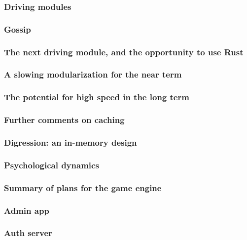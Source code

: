 \subsubsection{Driving modules}
\label{sec:future:impl:drivers}


\subsubsection{Gossip}
\label{sec:future:impl:gossip}


\subsubsection{The next driving module, and the opportunity to use Rust}
\label{sec:future:impl:rust}


\subsubsection{A slowing modularization for the near term}
\label{sec:future:impl:shortTerm}


\subsubsection{The potential for high speed in the long term}
\label{sec:future:impl:longTerm}


\subsubsection{Further comments on caching}
\label{sec:future:impl:moreCaching}


\subsubsection{Digression: an in-memory design}
\label{sec:future:impl:inMemoryDB}


\subsubsection{Psychological dynamics}
\label{sec:future:impl:psycho}


\subsubsection{Summary of plans for the game engine}
\label{sec:future:impl:engineSummary}


\subsubsection{Admin app}
\label{sec:future:impl:adminApp}


\subsubsection{Auth server}
\label{sec:future:impl:authServer}

